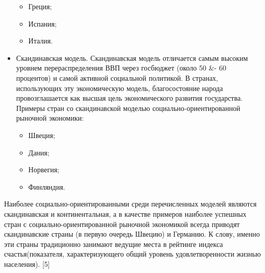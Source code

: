 \documentclass[14pt,a4paper]{article}
\begin{document}
\begin{itemize}
        \begin{itemize}
            \item Греция;
            \item Испания;
            \item Италия.
        \end{itemize}
        \item Скандинавская модель.
        Скандинавская модель отличается самым высоким уровнем перераспределения ВВП через госбюджет
        (около 50 \&- 60 процентов) и самой активной социальной политикой. В странах, использующих эту
        экономическую модель, благосостояние народа провозглашается как высшая цель экономического
        развития государства.
        Примеры стран со скандинавской моделью социально-ориентированной рыночной экономики:
        \begin{itemize}
            \item Швеция;
            \item Дания;
            \item Норвегия;
            \item Финляндия.
        \end{itemize}
    \end{itemize}
    \par
    Наиболее социально-ориентированными среди перечисленных моделей являются скандинавская и
    континентальная, а в качестве примеров наиболее успешных стран с
    социально-ориентированной рыночной экономикой всегда приводят скандинавские страны (в
    первую очередь Швецию) и Германию. К слову, именно эти страны традиционно
    занимают ведущие места в рейтинге индекса счастья(показателя, характеризующего
    общий уровень удовлетворенности жизнью населения). [5]
\end{document}
